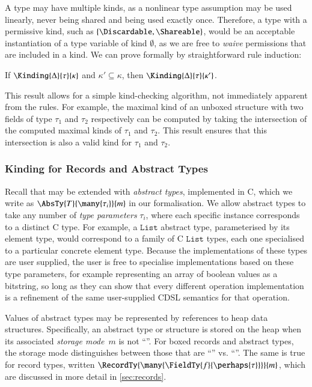 \documentclass[9pt\ifFinal\else,preprint,nocopyrightspace\fi,\ifAlpha\else natbib,authoryear\fi]{sigplanconf}
\begin{document}
A type may have multiple kinds, as a nonlinear type assumption may be used linearly, never being shared and being used exactly once. Therefore, a type with a
permissive kind, such as $\{\Discardable, \Shareable\}$, would be an acceptable instantiation of a type variable of kind $\emptyset$, as we are free to 
\emph{waive} permissions that are included in a kind. We can prove formally by straightforward rule induction:
\begin{lemma} If $\Kinding{\Delta}{\tau}{\kappa}$ and $\kappa' \subseteq \kappa$, then $\Kinding{\Delta}{\tau}{\kappa'}$.
\end{lemma}
\noindent This result allows for a simple kind-checking algorithm, not immediately apparent from the rules. For example, the maximal kind of an unboxed
structure with two fields of type $\tau_1$ and $\tau_2$ respectively can be computed by taking the intersection of the computed maximal kinds of $\tau_1$ and $\tau_2$. This result ensures
that this intersection is also a valid kind for $\tau_1$ and $\tau_2$.

\subsubsection{Kinding for Records and Abstract Types}\label{s:kindrec}

Recall that \CDSL may be extended with \emph{abstract types}, implemented in
C, which we write as
$\AbsTy{T}{\many{\tau_i}}{m}$ in our formalisation. We allow abstract types
to take any number of \emph{type parameters} ${\tau_i}$, where each specific
instance corresponds to a distinct C type. For example, a $\mathtt{List}$ abstract type,
parameterised by its element type, would correspond to a family of C $\mathtt{List}$ types,
each one specialised to a particular concrete element type. Because the implementations of these
types are user supplied, the user is free to specialise implementations based on these type parameters,
for example representing an array of boolean values as a bitstring, so long as they can show 
that every different operation implementation is a refinement of the same user-supplied CDSL 
semantics for that operation.

Values of abstract types may be represented by references to heap data structures. 
Specifically, an abstract type or structure is stored on the heap when its associated
\emph{storage mode}~$m$ is not ``\Unboxed''. For boxed records and abstract
types, the storage mode distinguishes between those that are ``\Writable'' vs.
``\ReadOnly''. The same is true for record types, written $\RecordTy{\many{\FieldTy{f}{\perhaps{\tau}}}}{m}$,
which are discussed in more detail in \autoref{sec:records}.
\end{document}
